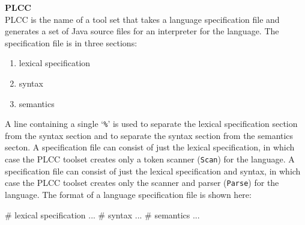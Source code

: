 \begin{minipage}[t]{\sw}
\slidenumber
\LARGE
{\bf PLCC}\\
\Large
PLCC is the name of a tool set
that takes a language specification file
and generates a set of Java source files
for an interpreter for the language.\exx
The specification file is in three sections:
\begin{enumerate}
\parskip -0.5ex
\item lexical specification
\item syntax
\item semantics 
\end{enumerate}
A line containing a single `\verb'%'' is used
to separate the lexical specification section from the syntax section
and to separate the syntax section from the semantics secton.\exx
A specification file can consist
of just the lexical specification,
in which case the PLCC toolset creates only
a token scanner (\verb'Scan') for the language.\exx
A specification file can consist
of just the lexical specification and syntax,
in which case the PLCC toolset creates only
the scanner and parser (\verb'Parse') for the language.\exx
The format of a language specification file 
is shown here:
{\large
\begin{qv}
# lexical specification
...
%
# syntax
...
%
# semantics
...
\end{qv}
}
\end{minipage}
\clearpage
